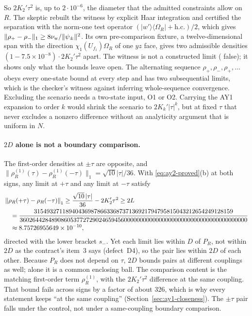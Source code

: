 So $2K_2'\tau^2$ is, up to $2\cdot10^{-6}$, the diameter that the admitted
constraints allow on $R$. The skeptic rebuilt the witness by explicit Haar
integration and certified the separation with the norm-one test operator
$(|w'\rangle\langle\Omega_R|+\text{h.c.})/2$, which gives
$\lVert \rho_+-\rho_-\rVert_1\ge8\nu_{\rm w}/\lVert \psi_\pm\rVert^2$. Its own
pre-comparison fixture, a twelve-dimensional span with the direction
$\chi_1(U_{f_1})\Omega_R$ of one $yz$ face, gives two admissible densities
$(1-7.5\times10^{-8})\cdot2K_2'\tau^2$ apart. The witness is not a
constructed limit ( false); it shows only what the
bounds leave open. The alternating sequence $\rho_+,\rho_-,\rho_+,\ldots$
obeys every one-state bound at every step and has two subsequential limits,
which is the checker's witness against inferring whole-sequence convergence.
Excluding the scenario needs a two-state input, O1 or O2. Carrying the AY1
expansion to order $k$ would shrink the scenario to $2K_k'|\tau|^k$, but at
fixed $\tau$ that never excludes a nonzero difference without an analyticity
argument that is uniform in $N$.

\paragraph{\texorpdfstring{$2D$}{2D} alone is not a boundary comparison.}
The first-order densities at $\pm\tau$ are opposite, and
$\lVert \rho^{(1)}_R(\tau)-\rho^{(1)}_R(-\tau)\rVert_1=\sqrt{10}|\tau|/36$. With
\eqref{eq:ay2-proved}(b) at both signs, any limit at $+\tau$ and any limit at
$-\tau$ satisfy
\begin{equation}
 \begin{aligned}
 &\left\lVert\rho_R(+\tau)-\rho_R(-\tau)\right\rVert_1\ge\frac{\sqrt{10}\,|\tau|}{36}-2K_2'\tau^2\ge2L\\
 &\quad=\frac{315493271189404369878663368737136921794795815043212654249128159}{360264428489086053772729024659456000000000000000000000000000000000000000}\\
 &\quad\approx8.75726955649\times10^{-10},
 \end{aligned}
 \label{eq:ay2-sign}
\end{equation}
directed with the lower bracket $s_-$. Yet each limit lies within $D$ of
$P_R$, not within $2D$ as the contract's item~3 says (defect~D4), so the pair
lies within $2D$ of each other. Because $P_R$ does not depend on $\tau$, $2D$
bounds pairs at different couplings as well; alone it is a common enclosing
ball. The comparison content is the matching first-order term $\rho^{(1)}_R$,
with the $2K_2'\tau^2$ difference at the same coupling. That bound fails
across signs by a factor of about 326, which is why every statement keeps ``at
the same coupling'' (Section~\ref{sec:ay1-closeness}). The $\pm\tau$ pair
falls under the  control, not under a same-coupling
boundary comparison.

